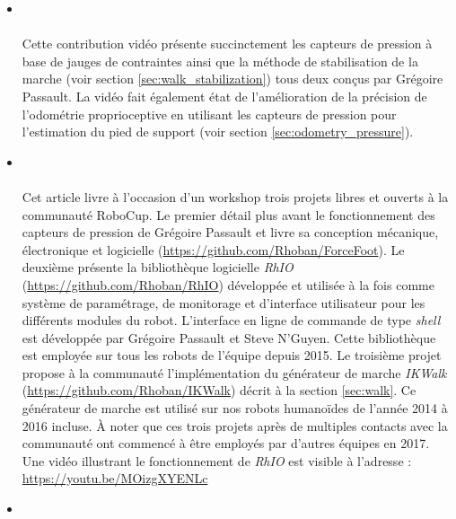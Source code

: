 \begin{itemize}
    \item \footnotesize{}\normalsize\leavevmode\\\\
        Cette contribution vidéo présente succinctement les capteurs de pression 
        à base de jauges de contraintes ainsi que la méthode de stabilisation
        de la marche (voir section \ref{sec:walk_stabilization}) tous deux conçus 
        par Grégoire Passault.
        La vidéo fait également état de l'amélioration de la précision de 
        l'odométrie proprioceptive en utilisant les capteurs de pression pour
        l'estimation du pied de support (voir section \ref{sec:odometry_pressure}).\\
    \item \footnotesize{}\normalsize\leavevmode\\\\
        Cet article livre à l'occasion d'un workshop trois projets libres et ouverts à la communauté RoboCup.
        Le premier détail plus avant le fonctionnement des capteurs de pression de Grégoire Passault
        et livre sa conception mécanique, électronique et logicielle (\url{https://github.com/Rhoban/ForceFoot}).
        Le deuxième présente la bibliothèque logicielle \textit{RhIO} (\url{https://github.com/Rhoban/RhIO})
        développée et utilisée à la fois comme système de paramétrage, de monitorage et 
        d'interface utilisateur pour les différents modules du robot.
        L'interface en ligne de commande de type \og \textit{shell} \fg est développée
        par Grégoire Passault et Steve N'Guyen.
        Cette bibliothèque est employée sur tous les robots de l'équipe depuis 2015.
        Le troisième projet propose à la communauté l'implémentation du générateur de marche 
        \textit{IKWalk} (\url{https://github.com/Rhoban/IKWalk}) décrit à la section \ref{sec:walk}.
        Ce générateur de marche est utilisé sur nos robots humanoïdes de l'année 2014 à 2016 incluse.
        À noter que ces trois projets après de multiples contacts avec la communauté 
        ont commencé à être employés par d'autres équipes en 2017.
        Une vidéo illustrant le fonctionnement de \textit{RhIO} est visible à l'adresse :
        \url{https://youtu.be/MOizgXYENLc}\\
    \item \footnotesize{}\normalsize\leavevmode\\\\

\end{itemize}
